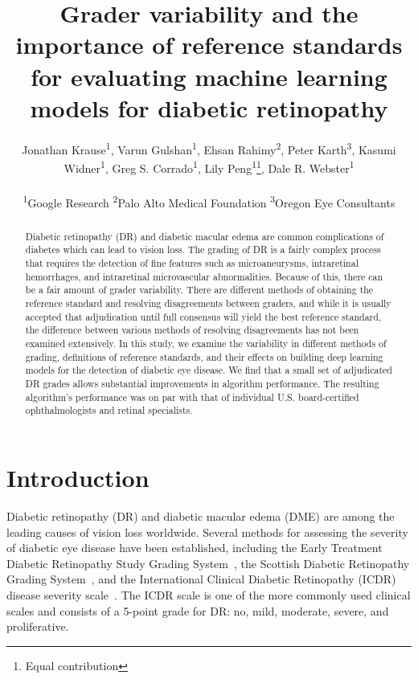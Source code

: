 \documentclass{llncs}
\newcommand{\repeatthanks}{\textsuperscript{\thefootnote}}
\begin{document}
\title{Grader variability and the importance of reference standards for evaluating machine learning models for diabetic retinopathy
}

\author{
  Jonathan Krause\textsuperscript{1}, Varun Gulshan\textsuperscript{1}, Ehsan Rahimy\textsuperscript{2}, Peter Karth\textsuperscript{3}, Kasumi Widner\textsuperscript{1}, Greg S. Corrado\textsuperscript{1}, Lily Peng\textsuperscript{1}\thanks{Equal contribution}, Dale R. Webster\textsuperscript{1}\repeatthanks \\
  \quad\\
  \textsuperscript{1}Google Research \qquad \textsuperscript{2}Palo Alto Medical Foundation \qquad \textsuperscript{3}Oregon Eye Consultants\\
}

\institute{}

\maketitle


\begin{abstract}
Diabetic retinopathy (DR) and diabetic macular edema are common complications of diabetes which can lead to vision loss. The grading of DR is a fairly complex process that requires the detection of fine features such as microaneurysms, intraretinal hemorrhages, and intraretinal microvascular abnormalities. Because of this, there can be a fair amount of grader variability. There are different methods of obtaining the reference standard and resolving disagreements between graders, and while it is usually accepted that adjudication until full consensus will yield the best reference standard, the difference between various methods of resolving disagreements has not been examined extensively. In this study, we examine the variability in different methods of grading, definitions of reference standards, and their effects on building deep learning models for the detection of diabetic eye disease. We find that a small set of adjudicated DR grades allows substantial improvements in algorithm performance. The resulting algorithm's performance was on par with that of individual U.S. board-certified ophthalmologists and retinal specialists.
\end{abstract}

\section{Introduction}
Diabetic retinopathy (DR) and diabetic macular edema (DME) are among the leading causes of vision loss worldwide. Several methods for assessing the severity of diabetic eye disease have been established, including the Early Treatment Diabetic Retinopathy Study Grading System~\cite{early1991grading}, the Scottish Diabetic Retinopathy Grading System~\cite{scotland}, and the International Clinical Diabetic Retinopathy (ICDR) disease severity scale~\cite{icdr}. The ICDR scale is one of the more commonly used clinical scales and consists of a 5-point grade for DR: no, mild, moderate, severe, and proliferative.
\end{document}
